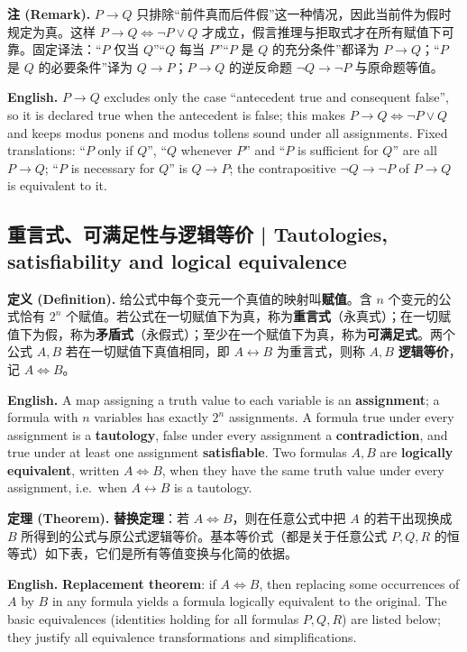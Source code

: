 \documentclass[UTF8,11pt,a4paper]{ctexart}
\newcommand{\EN}[1]{\par\noindent \textbf{English.} #1\par}
\newcommand{\DEF}[2]{\par\noindent\textbf{定义 (Definition).} #1\par\EN{#2}}
\newcommand{\THM}[2]{\par\noindent\textbf{定理 (Theorem).} #1\par\EN{#2}}
\newcommand{\REM}[2]{\par\noindent\textbf{注 (Remark).} #1\par\EN{#2}}
\begin{document}
\REM{$P\to Q$ 只排除“前件真而后件假”这一种情况，因此当前件为假时规定为真。这样 $P\to Q\Leftrightarrow\neg P\vee Q$ 才成立，假言推理与拒取式才在所有赋值下可靠。固定译法：“$P$ 仅当 $Q$”“$Q$ 每当 $P$”“$P$ 是 $Q$ 的充分条件”都译为 $P\to Q$；“$P$ 是 $Q$ 的必要条件”译为 $Q\to P$；$P\to Q$ 的逆反命题 $\neg Q\to\neg P$ 与原命题等值。}{$P\to Q$ excludes only the case ``antecedent true and consequent false'', so it is declared true when the antecedent is false; this makes $P\to Q\Leftrightarrow\neg P\vee Q$ and keeps modus ponens and modus tollens sound under all assignments. Fixed translations: ``$P$ only if $Q$'', ``$Q$ whenever $P$'' and ``$P$ is sufficient for $Q$'' are all $P\to Q$; ``$P$ is necessary for $Q$'' is $Q\to P$; the contrapositive $\neg Q\to\neg P$ of $P\to Q$ is equivalent to it.}

\subsection{重言式、可满足性与逻辑等价 | Tautologies, satisfiability and logical equivalence}
\DEF{给公式中每个变元一个真值的映射叫\textbf{赋值}。含 $n$ 个变元的公式恰有 $2^n$ 个赋值。若公式在一切赋值下为真，称为\textbf{重言式}（永真式）；在一切赋值下为假，称为\textbf{矛盾式}（永假式）；至少在一个赋值下为真，称为\textbf{可满足式}。两个公式 $A,B$ 若在一切赋值下真值相同，即 $A\leftrightarrow B$ 为重言式，则称 $A,B$ \textbf{逻辑等价}，记 $A\Leftrightarrow B$。}{A map assigning a truth value to each variable is an \textbf{assignment}; a formula with $n$ variables has exactly $2^n$ assignments. A formula true under every assignment is a \textbf{tautology}, false under every assignment a \textbf{contradiction}, and true under at least one assignment \textbf{satisfiable}. Two formulas $A,B$ are \textbf{logically equivalent}, written $A\Leftrightarrow B$, when they have the same truth value under every assignment, i.e.\ when $A\leftrightarrow B$ is a tautology.}
\THM{\textbf{替换定理}：若 $A\Leftrightarrow B$，则在任意公式中把 $A$ 的若干出现换成 $B$ 所得到的公式与原公式逻辑等价。基本等价式（都是关于任意公式 $P,Q,R$ 的恒等式）如下表，它们是所有等值变换与化简的依据。}{\textbf{Replacement theorem}: if $A\Leftrightarrow B$, then replacing some occurrences of $A$ by $B$ in any formula yields a formula logically equivalent to the original. The basic equivalences (identities holding for all formulas $P,Q,R$) are listed below; they justify all equivalence transformations and simplifications.}
\end{document}
